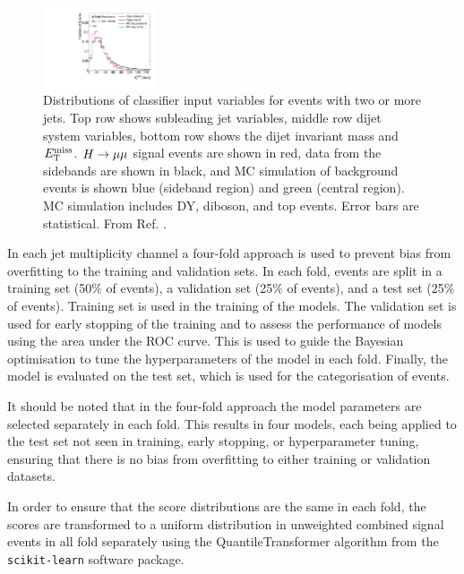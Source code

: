\begin{figure}[h!]
  \includegraphics[width=0.3\textwidth]{figures/hmumu/vars/metFinalTrk}
  \caption[Classifier input variables]{
  Distributions of classifier
  input variables for events with two or more jets. Top row shows subleading
  jet variables, middle row dijet system variables, bottom row shows the
  dijet invariant mass and $E_\text{T}^\text{miss}$. $H \rightarrow \mu\mu$ signal events
  are shown in red, data from the sidebands are shown in black, and MC
  simulation of background events is shown blue (sideband region) and
  green (central region). MC simulation includes DY, diboson, and top events.
  Error bars are statistical. From Ref. \cite{ATLAS-CONF-2019-028}.
  }
  \label{fig:hmumu:variables2}
\end{figure}

In each jet multiplicity channel a four-fold approach is used to
prevent bias from overfitting to the training and validation sets.
In each fold, events are split in a training set (50\% of events),
a validation set (25\% of events), and a test set (25\% of events).
Training set is used in the training of the models. The validation
set is used for early stopping of the training and to assess the
performance of models using the area under the ROC
\cite{journals/prl/Fawcett06} curve. This is used to guide the
Bayesian optimisation \cite{gp} to tune the hyperparameters of the
model in each fold. Finally, the model is evaluated on the test set,
which is used for the categorisation of events.

It should be noted that in the four-fold approach the model parameters
are selected separately in each fold. This results in four models,
each being applied to the test set not seen in training, early stopping,
or hyperparameter tuning, ensuring that there is no bias from overfitting
to either training or validation datasets.

In order to ensure that the score distributions are the same in each
fold, the scores are transformed to a uniform distribution in unweighted
combined signal events in all fold separately using the QuantileTransformer
algorithm from the \texttt{scikit-learn} \cite{scikit-learn} software package.

